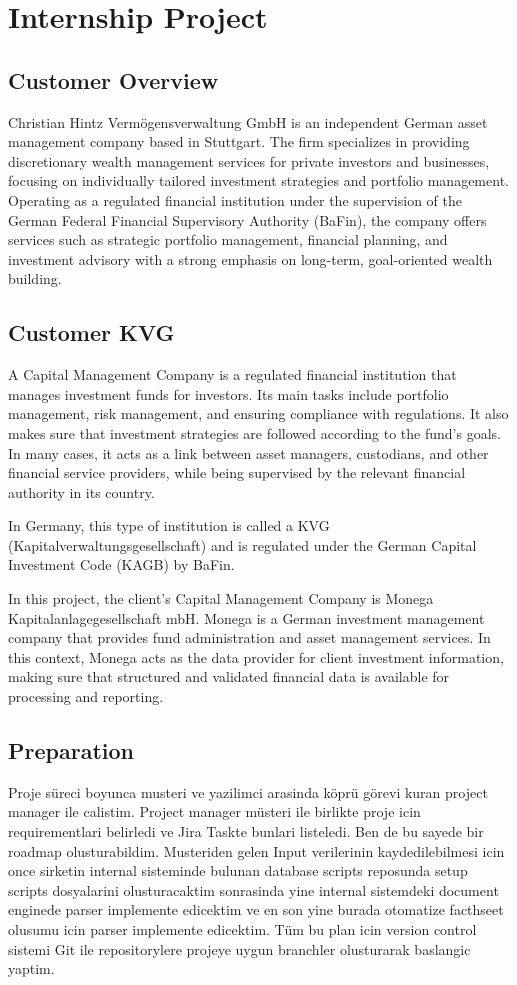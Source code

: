 
\chapter{Internship Project}


\section{Customer Overview}
Christian Hintz Vermögensverwaltung GmbH is an independent German asset management company based in Stuttgart. The firm specializes in providing discretionary wealth management services for private investors and businesses, focusing on individually tailored investment strategies and portfolio management. Operating as a regulated financial institution under the supervision of the German Federal Financial Supervisory Authority (BaFin), the company offers services such as strategic portfolio management, financial planning, and investment advisory with a strong emphasis on long-term, goal-oriented wealth building.
\section{Customer KVG}
A Capital Management Company is a regulated financial institution that manages investment funds for investors. Its main tasks include portfolio management, risk management, and ensuring compliance with regulations. It also makes sure that investment strategies are followed according to the fund’s goals. In many cases, it acts as a link between asset managers, custodians, and other financial service providers, while being supervised by the relevant financial authority in its country.

In Germany, this type of institution is called a KVG (Kapitalverwaltungsgesellschaft) and is regulated under the German Capital Investment Code (KAGB) by BaFin. 

In this project, the client’s Capital Management Company is Monega Kapitalanlagegesellschaft mbH. Monega is a German investment management company that provides fund administration and asset management services. In this context, Monega acts as the data provider for client investment information, making sure that structured and validated financial data is available for processing and reporting.
\section{Preparation}
Proje süreci boyunca musteri ve yazilimci arasinda köprü görevi kuran project manager ile calistim. Project manager müsteri ile birlikte proje icin requirementlari belirledi ve Jira Taskte bunlari listeledi. Ben de bu sayede bir roadmap olusturabildim. 
Musteriden gelen Input verilerinin kaydedilebilmesi icin once sirketin internal sisteminde bulunan database scripts reposunda setup scripts dosyalarini olusturacaktim sonrasinda yine internal sistemdeki document enginede parser implemente edicektim ve en son yine burada otomatize facthseet olusumu icin parser implemente edicektim. 
Tüm bu plan icin version control sistemi Git ile repositorylere projeye uygun branchler olusturarak baslangic yaptim.  
